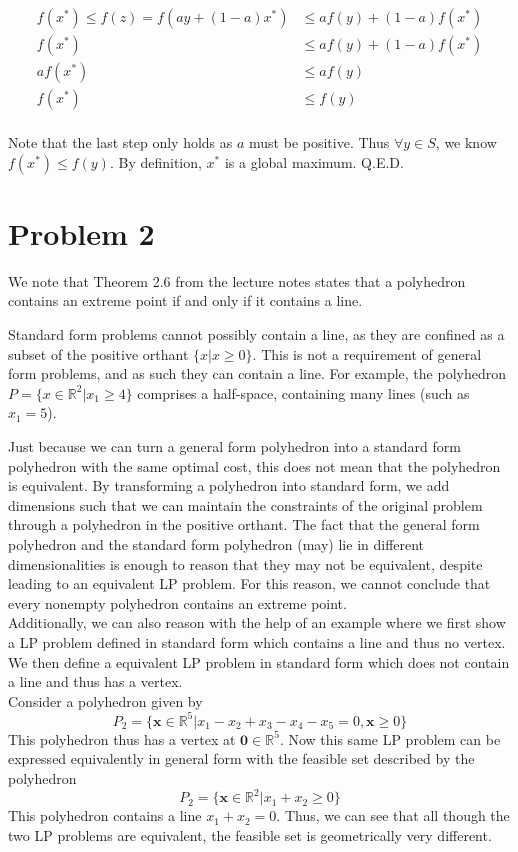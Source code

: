 \documentclass[11pt]{article}
\begin{document}
\begin{equation}
\begin{split}
f(x^*)\leq f(z) = f(ay + (1-a)x^*) &\leq af(y) + (1-a) f(x^*)\\
f(x^*) &\leq af(y) + (1-a) f(x^*) \\
af(x^*) &\leq af(y) \\
f(x^*) &\leq f(y) \\
\end{split}
\end{equation}

Note that the last step only holds as $a$ must be positive. Thus $\forall y\in S$, we know $f(x^*)\leq f(y)$. By definition, $x^*$ is a global maximum. Q.E.D. 

\section*{Problem 2}

We note that Theorem 2.6 from the lecture notes states that a polyhedron contains an extreme point if and only if it contains a line.

Standard form problems cannot possibly contain a line, as they are confined as a subset of the positive orthant $\{x|x\geq 0\}$. This is not a requirement of general form problems, and as such they can contain a line. For example, the polyhedron $P=\{x\in\mathbb{R}^2|x_1\geq 4\}$ comprises a half-space, containing many lines (such as $x_1=5$).

Just because we can turn a general form polyhedron into a standard form polyhedron with the same optimal cost, this does not mean that the polyhedron is equivalent. By transforming a polyhedron into standard form, we add dimensions such that we can maintain the constraints of the original problem through a polyhedron in the positive orthant. The fact that the general form polyhedron and the standard form polyhedron (may) lie in different dimensionalities is enough to reason that they may not be equivalent, despite leading to an equivalent LP problem. For this reason, we cannot conclude that every nonempty polyhedron contains an extreme point. \\
Additionally, we can also reason with the help of an example where we first show a LP problem defined in standard form which contains a line and thus no vertex. We then define a equivalent LP problem in standard form which does not contain a line and thus has a vertex. \\
Consider a polyhedron given by
\[ P_2 = \{ \textbf{x} \in \mathbb{R}^5 | x_1-x_2+x_3-x_4 - x_5 = 0, \textbf{x} \ge 0\}\]
This polyhedron thus has a vertex at \(\textbf{0} \in \mathbb{R}^5\). Now this same LP problem can be expressed equivalently in general form with the feasible set described by the polyhedron 
\[P_2 = \{\textbf{x} \in \mathbb{R}^2 | x_1 + x_2 \ge 0\}\]
This polyhedron contains a line \(x_1 + x_2 = 0\). Thus, we can see that all though the two LP problems are equivalent, the feasible set is geometrically very different.
\end{document}
